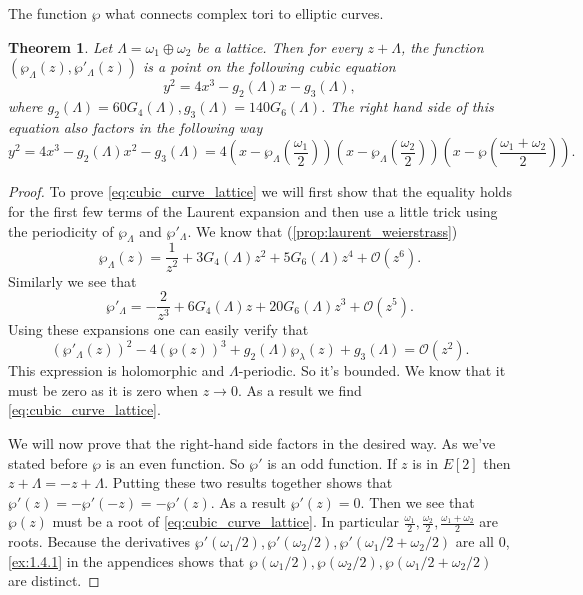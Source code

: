 \documentclass[a4paper]{article}
\theoremstyle{theoremdd}
\newtheorem{theorem}{Theorem}[section]
\theoremstyle{definitiondd}
\theoremstyle{remarkdd}
\begin{document}
The function $\wp$ what connects complex tori to elliptic curves. 
\begin{theorem}\label{thm:complex_tori_elliptic_curves}
	Let $\Lambda = \omega_1 \oplus \omega_2$ be a lattice. Then for every $z + \Lambda$, the function  $(\wp_\Lambda(z), \wp'_\Lambda(z))$ is a point on the following cubic equation \begin{equation} \label{eq:cubic_curve_lattice}
		y^2 = 4x^3 - g_2(\Lambda)x - g_{3}(\Lambda)
	,\end{equation}
	where $g_2(\Lambda) = 60 G_4(\Lambda), g_3(\Lambda) = 140 G_6(\Lambda)$.
	The right hand side of this equation also factors in the following way \[
		y^2 = 4x^3 - g_2(\Lambda) x^2 - g_3(\Lambda) = 4\left(x - \wp_\Lambda\left(\frac{\omega_1}{2}\right)\right)\left(x - \wp_{\Lambda}\left(\frac{\omega_2}{2}\right)\right)\left(x - \wp\left(\frac{\omega_1 + \omega_2}{2}\right)\right)
	.\] 
\end{theorem}
\begin{proof}
	To prove \cref{eq:cubic_curve_lattice} we will first show that the equality holds for the first few terms of the Laurent expansion and then use a little trick using the periodicity of $\wp_\Lambda$ and $\wp'_\Lambda$.
	We know that (\cref{prop:laurent_weierstrass})\[
		\wp_\Lambda(z) = \frac{1}{z^2} + 3 G_4(\Lambda) z^2 + 5G_6(\Lambda) z^{4} + \mathcal{O} (z^{6})
	.\] 
	Similarly we see that \[
		\wp'_\Lambda = - \frac{2}{z^3} + 6 G_4(\Lambda)z + 20G_6(\Lambda)z^3 + \mathcal{O} (z^{5})	
	.\] 
	Using these expansions one can easily verify that \[
		(\wp'_\Lambda(z))^2 - 4(\wp(z))^3 + g_2(\Lambda)\wp_{\lambda}(z) + g_{3}(\Lambda)    = \mathcal{O} (z^{2})
	.\] 
	This expression is holomorphic and $\Lambda$-periodic. So it's bounded. We know that it must be zero as it is zero when  $z \to 0$. 
	As a result we find \cref{eq:cubic_curve_lattice}.

	We will now prove that the right-hand side factors in the desired way.
	As we've stated before $\wp$ is an even function. So $\wp'$ is an odd function. 
	If $z$ is in $E[2]$ then  $z + \Lambda = - z + \Lambda$. 
	Putting these two results together shows that $\wp'(z) = - \wp'(-z) = -\wp'(z)$.  
	As a result $\wp'(z) = 0$.
	Then we see that $\wp(z)$ must be a root of \cref{eq:cubic_curve_lattice}. 
	In particular  $\frac{\omega_1}{2}, \frac{\omega_2}{2}, \frac{\omega_1 + \omega_2}{2}$ are roots. 
	Because the derivatives $\wp'(\omega_1 / 2 ), \wp'(\omega_2 / 2), \wp'(\omega_1 / 2 + \omega_2 /2)$ are all $0$, \cref{ex:1.4.1} in the appendices shows that $\wp(\omega_1 / 2), \wp(\omega_2 / 2), \wp(\omega_1 / 2 + \omega_2 / 2)$ are distinct.
\end{proof}
\end{document}

